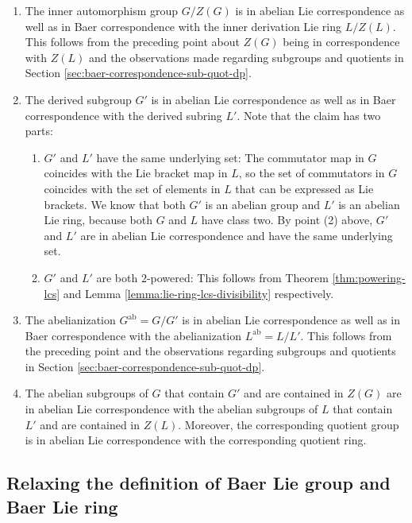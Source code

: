 \documentclass{ucetd}
\begin{document}
\begin{enumerate}
\item The inner automorphism group $G/Z(G)$ is in abelian Lie
  correspondence as well as in Baer correspondence with the inner
  derivation Lie ring $L/Z(L)$. This follows from the preceding point
  about $Z(G)$ being in correspondence with $Z(L)$ and the
  observations made regarding subgroups and quotients in Section
  \ref{sec:baer-correspondence-sub-quot-dp}.
\item The derived subgroup $G'$ is in abelian Lie correspondence as
  well as in Baer correspondence with the derived subring $L'$. Note
  that the claim has two parts:

  \begin{enumerate}
  \item $G'$ and $L'$ have the same underlying set: The commutator map
    in $G$ coincides with the Lie bracket map in $L$, so the set of
    commutators in $G$ coincides with the set of elements in $L$ that
    can be expressed as Lie brackets. We know that both $G'$ is an
    abelian group and $L'$ is an abelian Lie ring, because both $G$
    and $L$ have class two.  By point (2) above, $G'$ and $L'$ are in
    abelian Lie correspondence and have the same underlying set.
  \item $G'$ and $L'$ are both $2$-powered: This follows from Theorem
    \ref{thm:powering-lcs} and Lemma
    \ref{lemma:lie-ring-lcs-divisibility} respectively.
  \end{enumerate}
\item The abelianization $G^{\operatorname{ab}} = G/G'$ is in abelian
  Lie correspondence as well as in Baer correspondence with the
  abelianization $L^{\operatorname{ab}} = L/L'$. This follows from the
  preceding point and the observations regarding subgroups and
  quotients in Section \ref{sec:baer-correspondence-sub-quot-dp}.
\item The abelian subgroups of $G$ that contain $G'$ and are contained
  in $Z(G)$ are in abelian Lie correspondence with the abelian
  subgroups of $L$ that contain $L'$ and are contained in
  $Z(L)$. Moreover, the corresponding quotient group is in abelian Lie
  correspondence with the corresponding quotient ring.
\end{enumerate}

\subsection{Relaxing the definition of Baer Lie group and Baer Lie ring}\label{sec:baer-correspondence-definition-relaxation}
\end{document}
